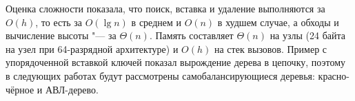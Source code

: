 \documentclass[otchet]{SCWorks}
\begin{document}
Оценка сложности показала, что поиск, вставка и удаление выполняются за
$O(h)$, то есть за $O(\lg n)$ в среднем и $O(n)$ в худшем случае, а обходы
и вычисление высоты "--- за $\Theta(n)$. Память составляет $\Theta(n)$ на
узлы (24 байта на узел при 64-разрядной архитектуре) и $O(h)$ на стек
вызовов. Пример с упорядоченной вставкой ключей показал вырождение дерева в
цепочку, поэтому в следующих работах будут рассмотрены самобалансирующиеся
деревья: красно-чёрное и АВЛ-дерево.






\appendix
\end{document}
